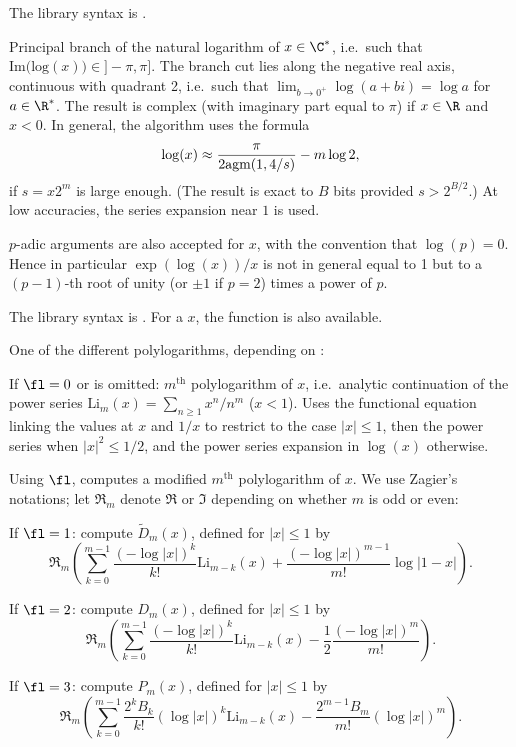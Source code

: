 The library syntax is .

\label{se:log}
Principal branch of the natural logarithm of
$x \in \C^*$, i.e.~such that $\text{Im(log}(x))\in{} ]-\pi,\pi]$.
The branch cut lies
along the negative real axis, continuous with quadrant 2, i.e.~such that
$\lim_{b\to 0^+} \log (a+bi) = \log a$ for $a \in\R^*$. The result is complex
(with imaginary part equal to $\pi$) if $x\in \R$ and $x < 0$. In general,
the algorithm uses the formula
$$\log(x) \approx {\pi\over 2\text{agm}(1, 4/s)} - m \log 2, $$
if $s = x 2^m$ is large enough. (The result is exact to $B$ bits provided
$s > 2^{B/2}$.) At low accuracies, the series expansion near $1$ is used.

$p$-adic arguments are also accepted for $x$, with the convention that
$\log(p)=0$. Hence in particular $\exp(\log(x))/x$ is not in general equal to
1 but to a $(p-1)$-th root of unity (or $\pm1$ if $p=2$) times a power of $p$.

The library syntax is .
For a  $x$, the function
 is also available.

\label{se:polylog}
One of the different polylogarithms, depending on \fl:

If $\fl=0$ or is omitted: $m^\text{th}$ polylogarithm of $x$, i.e.~analytic
continuation of the power series $\text{Li}_m(x)=\sum_{n\ge1}x^n/n^m$
($x < 1$). Uses the functional equation linking the values at $x$ and $1/x$
to restrict to the case $|x|\leq 1$, then the power series when
$|x|^2\le1/2$, and the power series expansion in $\log(x)$ otherwise.

Using $\fl$, computes a modified $m^\text{th}$ polylogarithm of $x$.
We use Zagier's notations; let $\Re_m$ denote $\Re$ or $\Im$ depending
on whether $m$ is odd or even:

If $\fl=1$: compute $\tilde D_m(x)$, defined for $|x|\le1$ by
$$\Re_m\left(\sum_{k=0}^{m-1} \dfrac{(-\log|x|)^k}{k!}\text{Li}_{m-k}(x)
+\dfrac{(-\log|x|)^{m-1}}{m!}\log|1-x|\right).$$

If $\fl=2$: compute $D_m(x)$, defined for $|x|\le1$ by
$$\Re_m\left(\sum_{k=0}^{m-1}\dfrac{(-\log|x|)^k}{k!}\text{Li}_{m-k}(x)
-\dfrac{1}{2}\dfrac{(-\log|x|)^m}{m!}\right).$$

If $\fl=3$: compute $P_m(x)$, defined for $|x|\le1$ by
$$\Re_m\left(\sum_{k=0}^{m-1}\dfrac{2^kB_k}{k!}(\log|x|)^k\text{Li}_{m-k}(x)
-\dfrac{2^{m-1}B_m}{m!}(\log|x|)^m\right).$$


